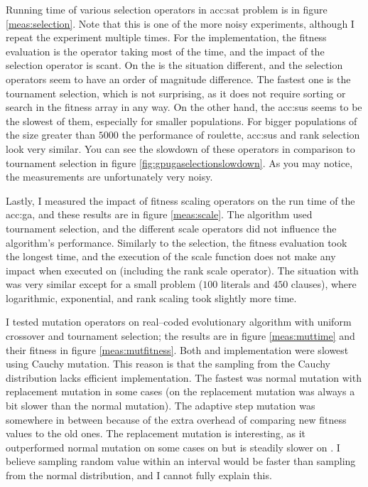 Running time of various selection operators in \acrshort{acc:sat} problem is in figure \ref{meas:selection}. Note that this is one of the more noisy experiments, although I repeat the experiment multiple times. For the \cpu implementation, the fitness evaluation is the operator taking most of the time, and the impact of the selection operator is scant. On the \gpu is the situation different, and the selection operators seem to have an order of magnitude difference. The fastest one is the tournament selection, which is not surprising, as it does not require sorting or search in the fitness array in any way. On the other hand, the \acrshort{acc:sus} seems to be the slowest of them, especially for smaller populations. For bigger populations of the size greater than $5000$ the performance of roulette, \acrshort{acc:sus} and rank selection look very similar. You can see the slowdown of these operators in comparison to tournament selection in figure \ref{fig:gpugaselectionslowdown}. As you may notice, the measurements are unfortunately very noisy.

Lastly, I measured the impact of fitness scaling operators on the run time of the \acrshort{acc:ga}, and these results are in figure \ref{meas:scale}. The algorithm used tournament selection, and the different scale operators did not influence the algorithm's performance. Similarly to the selection, the fitness evaluation took the longest time, and the execution of the scale function does not make any impact when executed on \cpu (including the rank scale operator). The situation with \gpu was very similar except for a small problem ($100$ literals and $450$ clauses), where logarithmic, exponential, and rank scaling took slightly more time.

I tested mutation operators on real--coded evolutionary algorithm with uniform crossover and tournament selection; the results are in figure \ref{meas:muttime} and their fitness in figure \ref{meas:mutfitness}. Both \cpu and \gpu implementation were slowest using Cauchy mutation. This reason is that the sampling from the Cauchy distribution lacks efficient implementation. The fastest was normal mutation with replacement mutation in some \gpu cases (on \cpu the replacement mutation was always a bit slower than the normal mutation). The adaptive step mutation was somewhere in between because of the extra overhead of comparing new fitness values to the old ones. The replacement mutation is interesting, as it outperformed normal mutation on some cases on \gpuns but is steadily slower on \cpuns. I believe sampling random value within an interval would be faster than sampling from the normal distribution, and I cannot fully explain this.

